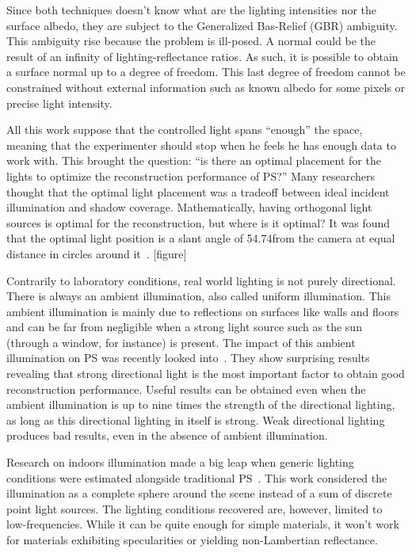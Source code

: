 Since both techniques doesn't know what are the lighting intensities nor the surface albedo, they are subject to the Generalized Bas-Relief (GBR) ambiguity. This ambiguity rise because the problem is ill-posed. A normal could be the result of an infinity of lighting-reflectance ratios. As such, it is possible to obtain a surface normal up to a degree of freedom. This last degree of freedom cannot be constrained without external information such as known albedo for some pixels or precise light intensity.

All this work suppose that the controlled light spans ``enough'' the space, meaning that the experimenter should stop when he feels he has enough data to work with. This brought the question: ``is there an optimal placement for the lights to optimize the reconstruction performance of PS?'' Many researchers thought that the optimal light placement was a tradeoff between ideal incident illumination and shadow coverage. Mathematically, having orthogonal light sources is optimal for the reconstruction, but where is it optimal? It was found that the optimal light position is a slant angle of 54.74\degree from the camera at equal distance in circles around it~\cite{spence-iwtas-03,drbohlav-iccv-05}. [figure]

Contrarily to laboratory conditions, real world lighting is not purely directional. There is always an ambient illumination, also called uniform illumination. This ambient illumination is mainly due to reflections on surfaces like walls and floors and can be far from negligible when a strong light source such as the sun (through a window, for instance) is present. The impact of this ambient illumination on PS was recently looked into~\cite{Angelopoulou2013}. They show surprising results revealing that strong directional light is the most important factor to obtain good reconstruction performance. Useful results can be obtained even when the ambient illumination is up to nine times the strength of the directional lighting, as long as this directional lighting in itself is strong. Weak directional lighting produces bad results, even in the absence of ambient illumination.

Research on indoors illumination made a big leap when generic lighting conditions were estimated alongside traditional PS~\cite{basri-ijcv-2007}. This work considered the illumination as a complete sphere around the scene instead of a sum of discrete point light sources. The lighting conditions recovered are, however, limited to low-frequencies. While it can be quite enough for simple materials, it won't work for materials exhibiting specularities or yielding non-Lambertian reflectance.

